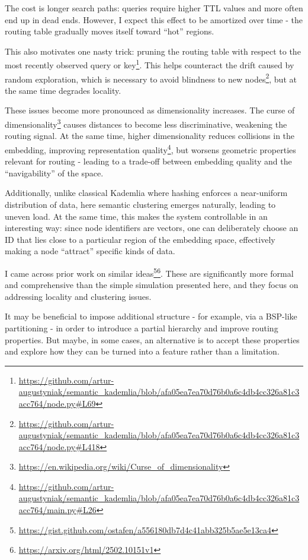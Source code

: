 \documentclass[twocolumn,9pt]{extarticle}
\begin{document}
The cost is longer search paths: queries require higher TTL values and more often end up in dead ends. However, I expect this effect to be amortized over time - the routing table gradually moves itself toward “hot” regions.

This also motivates one nasty trick: pruning the routing table with respect to the most recently observed query or key\footnote{\url{https://github.com/artur-augustyniak/semantic_kademlia/blob/afa05ea7ea70d76b0a6c4db4cc326a81c3acc764/node.py\#L69}}. 
This helps counteract the drift caused by random exploration, which is necessary to avoid blindness to new nodes\footnote{\url{https://github.com/artur-augustyniak/semantic_kademlia/blob/afa05ea7ea70d76b0a6c4db4cc326a81c3acc764/node.py\#L418}}, but at the same time degrades locality.

These issues become more pronounced as dimensionality increases. The curse of dimensionality\footnote{\url{https://en.wikipedia.org/wiki/Curse_of_dimensionality}} causes distances to become less discriminative, weakening the routing signal. At the same time, higher dimensionality reduces collisions in the embedding, improving representation quality\footnote{\url{https://github.com/artur-augustyniak/semantic_kademlia/blob/afa05ea7ea70d76b0a6c4db4cc326a81c3acc764/main.py\#L26}}, 
but worsens geometric properties relevant for routing - leading to a trade-off between embedding quality and the “navigability” of the space.

Additionally, unlike classical Kademlia where hashing enforces a near-uniform distribution of data, here semantic clustering emerges naturally, leading to uneven load.
At the same time, this makes the system controllable in an interesting way: since node identifiers are vectors, one can deliberately choose an ID that lies close to a particular region of the embedding space, effectively making a node “attract” specific kinds of data.

I came across prior work on similar ideas\footnote{\url{https://gist.github.com/ostafen/a556180db7d4c41abb325b5ae5e13ca4}}\footnote{\url{https://arxiv.org/html/2502.10151v1}}.
These are significantly more formal and comprehensive than the simple simulation presented here, and they focus on addressing locality and clustering issues.

It may be beneficial to impose additional structure - for example, via a BSP-like partitioning - in order to introduce a partial hierarchy and improve routing properties.
But maybe, in some cases, an alternative is to accept these properties and explore how they can be turned into a feature rather than a limitation.
\end{document}
